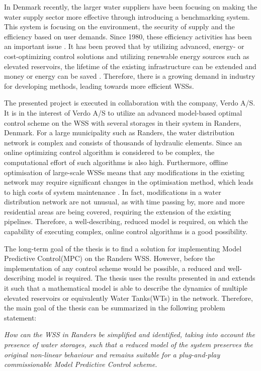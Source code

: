 In Denmark recently, the larger water suppliers have been focusing on making the water supply sector more effective through introducing a benchmarking system. This system is focusing on the environment, the security of supply and the efficiency based on user demands. Since 1980, these efficiency activities has been an important issue \cite{water_denmark}. It has been proved that by utilizing advanced, energy- or cost-optimizing control solutions and utilizing renewable energy sources such as elevated reservoirs, the lifetime of the existing infrastructure can be extended and money or energy can be saved \cite{sustainable_water}. Therefore, there is a growing demand in industry for developing methods, leading towards more efficient WSSs. 

The presented project is executed in collaboration with the company, Verdo A/S. It is in the interest of Verdo A/S to utilize an advanced model-based optimal control scheme on the WSS with several storages in their system in Randers, Denmark. For a large municipality such as Randers, the water distribution network is complex and consists of thousands of hydraulic elements. Since an online optimizing control algorithm is considered to be complex, the computational effort of such algorithms is also high. Furthermore, offline optimisation of large-scale WSSs means that any modifications in the existing network may require significant changes in the optimisation method, which leads to high costs of system maintenance \cite{brdys1994operational}. In fact, modifications in a water distribution network are not unusual, as with time passing by, more and more residential areas are being covered, requiring the extension of the existing pipelines. Therefore, a well-describing, reduced model is required, on which the capability of executing complex, online control algorithms is a good possibility. 

The long-term goal of the thesis is to find a solution for implementing Model Predictive Control(MPC) on the Randers WSS. However, before the implementation of any control scheme would be possible, a reduced and well-describing model is required. The thesis uses the results presented in \cite{oneinput_paper} and extends it such that a mathematical model is able to describe the dynamics of multiple elevated reservoirs or equivalently Water Tanks(WTs) in the network.  Therefore, the main goal of the thesis can be summarized in the following problem statement:

\emph{How can the WSS in Randers be simplified and identified, taking into account the presence of water storages, such that a reduced model of the system preserves the original non-linear behaviour and remains suitable for a plug-and-play commissionable Model Predictive Control scheme.}









